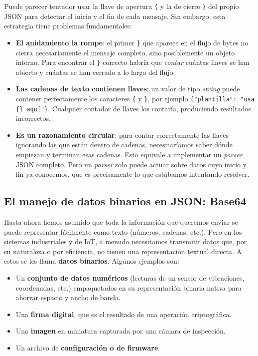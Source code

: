 \begin{note}
Puede parecer tentador usar la llave de apertura \texttt{\{} y la de cierre \texttt{\}} del propio JSON para detectar el inicio y el fin de cada mensaje. Sin embargo, esta estrategia tiene problemas fundamentales:

\begin{itemize}
    \item \textbf{El anidamiento la rompe}: el primer \texttt{\}} que aparece en el flujo de bytes no cierra necesariamente el mensaje completo, sino posiblemente un objeto interno. Para encontrar el \texttt{\}} correcto habría que \emph{contar} cuántas llaves se han abierto y cuántas se han cerrado a lo largo del flujo.
    \item \textbf{Las cadenas de texto contienen llaves}: un valor de tipo \textit{string} puede contener perfectamente los caracteres \texttt{\{} y \texttt{\}}, por ejemplo \lstinline|{"plantilla": "usa {} aquí"}|. Cualquier contador de llaves los contaría, produciendo resultados incorrectos.
    \item \textbf{Es un razonamiento circular}: para contar correctamente las llaves ignorando las que están dentro de cadenas, necesitaríamos saber dónde empiezan y terminan esas cadenas. Esto equivale a implementar un \textit{parser} JSON completo. Pero un \textit{parser} solo puede actuar sobre datos cuyo inicio y fin ya conocemos, que es precisamente lo que estábamos intentando resolver.
\end{itemize}


\end{note}

\subsection{El manejo de datos binarios en JSON: Base64}
Hasta ahora hemos asumido que toda la información que queremos enviar se puede representar fácilmente como texto (números, cadenas, etc.). Pero en los sistemas industriales y de IoT, a menudo necesitamos transmitir datos que, por su naturaleza o por eficiencia, no tienen una representación textual directa. A estos se les llama \textbf{datos binarios}. Algunos ejemplos son:

\begin{itemize}
    \item Un \textbf{conjunto de datos numéricos} (lecturas de un sensor de vibraciones, coordenadas, etc.) empaquetados en su representación binaria nativa para ahorrar espacio y ancho de banda.
    \item Una \textbf{firma digital}, que es el resultado de una operación criptográfica.
    \item Una \textbf{imagen} en miniatura capturada por una cámara de inspección.
    \item Un archivo de \textbf{configuración o de firmware}.
\end{itemize}

